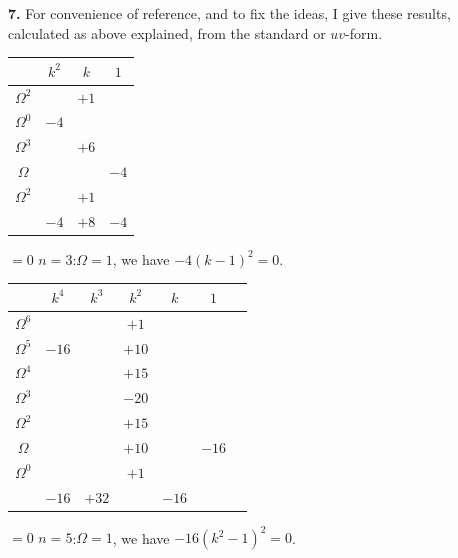 \documentclass[11pt]{article}
\begin{document}
\textbf{7.} For convenience of reference, and to fix the ideas, I give these results, calculated as above explained, from the standard or $u v$-form.

\begin{center}
\begin{tabular}{c|ccc}
& $k^{2}$ & $k$ & $1$ \\\hline
$\Omega^{2}$ & & $+1$ & \\
$\Omega^{0}$ & $-4$ & & \\
$\Omega^{3}$ & & $+6$ & \\
$\Omega$ & & & $-4$ \\
$\Omega^{2}$ & & $+1$ & \\\hline
& $-4$ & $+8$ & $-4$
\end{tabular}
\quad $=0$ \quad $n=3$:\quad $\Omega=1$, we have $-4(k-1)^{2}=0$.
\end{center}

\begin{center}
\begin{tabular}{c|cccccc}
& $k^{4}$ & $k^{3}$ & $k^{2}$ & $k$ & $1$ & \\\hline
$\Omega^{6}$ & & & $+1$ & & & \\
$\Omega^{5}$ & $-16$ & & $+10$ & & & \\
$\Omega^{4}$ & & & $+15$ & & & \\
$\Omega^{3}$ & & & $-20$ & & & \\
$\Omega^{2}$ & & & $+15$ & & & \\
$\Omega$ & & & $+10$ & & $-16$ & \\
$\Omega^{0}$ & & & $+1$ & & & \\\hline
& $-16$ & $+32$ & & $-16$ &
\end{tabular}
\quad $=0$ \quad $n=5$:\quad $\Omega=1$, we have $-16(k^{2}-1)^{2}=0$.
\end{center}
\end{document}
